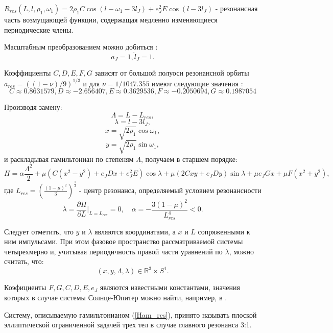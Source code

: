 $R_{res}(L,l,\rho_1,\omega_1) = 2 \rho_1 C \cos(l-\omega_1-3 l_J)+e_J^2E \cos(l - 3 l_J)$ - резонансная часть возмущающей функции, содержащая медленно изменяющиеся периодические члены.

Масштабным преобразованием можно добиться  \cite{wis2}:
$$a_J=1, \dot l_J= 1 .$$

Коэффициенты $C,D,E,F,G$ зависят от большой полуоси резонансной орбиты $a_{res} = ((1-\nu)/9)^{1/3}$ и для $\nu = 1/1047.355$ имеют следующие значения \cite{wisdom}:
$$C \approx 0.8631579, D \approx -2.656407, E \approx 0.3629536, F \approx -0.2050694, G \approx 0.1987054$$

Производя замену:
$$\Lambda = L - L_{res},$$
$$\lambda = l - 3 l_J,$$
$$x = \sqrt{2 \rho_1} \cos \omega_1,$$
$$y = \sqrt{2 \rho_1} \sin \omega_1,$$
и раскладывая гамильтониан по степеням $\Lambda$, получаем в старшем порядке:
\begin{equation}
\label{Ham_res}
H = \alpha \frac{\Lambda^2}{2} + \mu \left( C(x^2-y^2)+e_J D x + e_J^2 E \right) \cos \lambda + \mu (2Cxy+e_J D y) \sin \lambda + \mu e_J G x + \mu F(x^2+y^2),
\end{equation}
где $L_{res} = \left( \frac{(1-\mu)^2}{3} \right)^\frac13$ - центр резонанса, определяемый условием резонансности 
$$
\dot \lambda = \frac{\partial H}{\partial L}|_{L=L_{res}}=0, \quad \alpha = -\frac{3(1-\mu)^2}{L_{res}^4} < 0.$$

Следует отметить, что $y$ и $\lambda$ являются координатами, а $x$ и $L$ сопряженными к ним импульсами. При этом фазовое пространство рассматриваемой системы  четырехмерно и, учитывая периодичность правой части уравнений по $\lambda$, можно считать, что:
$$(x,y,\Lambda,\lambda) \in \mathbb{R}^3 \times S^1 .$$

Коэфициенты $F,G,C,D,E,e_J$ являются известными константами, значения которых в случае системы Солнце-Юпитер можно найти, например, в \cite{wis1}.

Систему, описываемую гамильтонианом (\ref{Ham_res}), принято называть плоской эллиптической ограниченной задачей трех тел в случае главного резонанса 3:1.













































